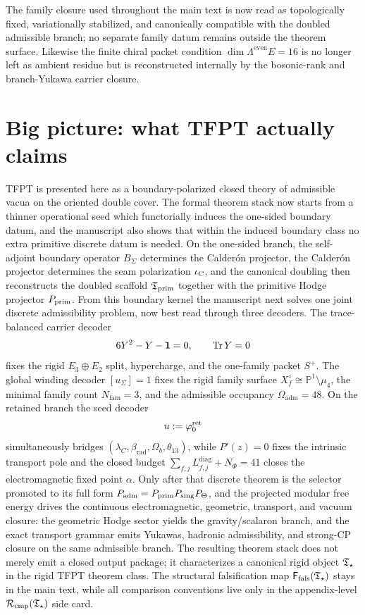 The family closure used throughout the main text is now read as topologically fixed, variationally
stabilized, and canonically compatible with the doubled admissible branch; no separate family datum
remains outside the theorem surface. Likewise the finite chiral packet condition
$\dim\Lambda^{\mathrm{even}}E=16$ is no longer left as ambient residue but is reconstructed
internally by the bosonic-rank and branch-Yukawa carrier closure.

\section{Big picture: what TFPT actually claims}

TFPT is presented here as a boundary-polarized closed theory of admissible vacua on the oriented
double cover. The formal theorem stack now starts from a thinner operational seed which functorially
induces the one-sided boundary datum, and the manuscript also shows that within the induced
boundary class no extra primitive discrete datum is needed. On the
one-sided branch, the self-adjoint boundary operator $B_\Sigma$ determines the Calder\'on projector,
the Calder\'on projector determines the seam polarization
$\iota_{\mathrm C}$, and the canonical doubling then reconstructs the doubled scaffold $\mathfrak T_{\mathrm{prim}}$ together with
the primitive Hodge projector $P_{\mathrm{prim}}$. From this boundary kernel the manuscript next solves one
joint discrete admissibility problem, now best read through three decoders. The trace-balanced
carrier decoder
\[
6Y^2-Y-\mathbf 1=0,
\qquad
\operatorname{Tr} Y=0
\]
fixes the rigid $E_3\oplus E_2$ split, hypercharge, and the one-family packet $S^+$. The global
winding decoder $[u_\Sigma]=1$ fixes the rigid family surface $X_f^\circ\cong\mathbb P^1\setminus
\mu_4$, the minimal family count $N_{\mathrm{fam}}=3$, and the admissible occupancy
$\Omega_{\mathrm{adm}}=48$. On the retained branch the seed decoder
\[
u:=\varphi_0^{\mathrm{ret}}
\]
simultaneously bridges $(\lambda_C,\beta_{\mathrm{rad}},\Omega_b,\theta_{13})$, while
$P'(z)=0$ fixes the intrinsic transport pole and the closed budget
$\sum_{f,j}L_{f,j}^{\mathrm{diag}}+N_\Phi=41$ closes the electromagnetic fixed point $\alpha$.
Only after that discrete theorem is the selector promoted to its full form
$P_{\mathrm{adm}}=P_{\mathrm{prim}} P_{\mathrm{sing}}P_{\Theta}$, and the projected modular free energy drives the
continuous electromagnetic, geometric, transport, and vacuum closure: the geometric Hodge sector
yields the gravity/scalaron branch, and the exact transport grammar emits Yukawas, hadronic
admissibility, and strong-CP closure on the same admissible branch. The resulting theorem stack
does not merely emit a closed output package; it characterizes a canonical rigid object $\mathfrak T_{\star}$ in
the rigid TFPT theorem class. The structural falsification map $\mathsf F_{\mathrm{fals}}(\mathfrak T_{\star})$ stays in the main
text, while all comparison conventions live only in the appendix-level $\mathcal R_{\mathrm{cmp}}(\mathfrak T_{\star})$ side card.

